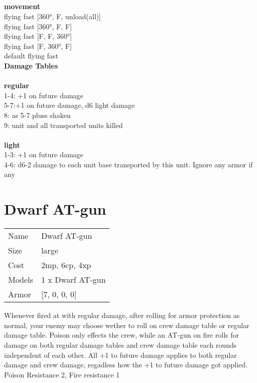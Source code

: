 \ \\

\ \\
 
\ \\



\ \\ {\bf movement } \\
flying fast [360°, F, unload(all)] \\
flying fast [360°, F, F] \\
flying fast [F, F, 360°] \\
flying fast [F, 360°, F] \\
default flying fast \\


{\bf Damage Tables} \\
\ \\ {\bf regular } \\
1-4: +1 on future damage \\
5-7:+1 on future damage, d6 light damage \\
8: as 5-7 pluss shaken \\
9: unit and all transported units killed \\
\ \\ {\bf light } \\
1-3: +1 on future damage \\
4-6: d6-2 damage to each unit base transported by this unit. Ignore any armor if any \\










\pagebreak\pagebreak

\section{ Dwarf AT-gun }

\begin{tabular}{ll}
  Name & Dwarf AT-gun \\
  Size & large\\
  Cost & 2mp, 6cp, 4xp\\
  Models & 1 x Dwarf AT-gun\\
  Armor & [7, 0, 0, 0]\\
\end{tabular}

\noindent Whenever fired at with regular damage, after rolling for armor protection as normal, your enemy may choose wether to roll on crew damage table or regular damage table. Poison only effects the crew, while an AT-gun on fire rolls for damage on both regular damage tables and crew damage table each rounds independent of each other. All +1 to future damage applies to both regular damage and crew damage, regadless how the +1 to future damage got applied.\\ 
 Poison Resistance 2, Fire resistance 1\\ 


